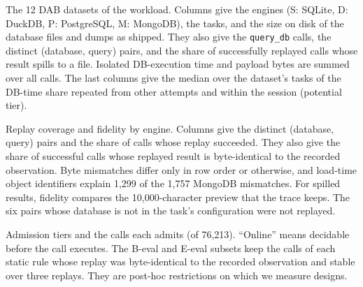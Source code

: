 \begin{table}[tbp]
  \caption{The 12 DAB datasets of the workload. Columns give the engines (S: SQLite, D: DuckDB, P: PostgreSQL, M:
  MongoDB), the tasks, and the size on disk of the database files and dumps as shipped. They also give the
  \texttt{query\_db} calls, the distinct (database, query) pairs, and the share of successfully replayed calls whose
  result spills to a file. Isolated DB-execution time and payload bytes are summed over all calls. The last columns
  give the median over the dataset's tasks of the DB-time share repeated from other attempts and within the session
  (potential tier).}
  \label{tab:datasets}
  \small
  
\end{table}

\begin{table}[htbp]
  \caption{Replay coverage and fidelity by engine. Columns give the distinct (database, query) pairs and the share of calls
  whose replay succeeded. They also give the share of successful calls whose replayed result is byte-identical to
  the recorded observation. Byte mismatches differ only in row order or otherwise, and load-time object identifiers
  explain 1,299 of the 1,757 MongoDB mismatches. For spilled results, fidelity compares the 10,000-character preview that the trace keeps.
  The six pairs whose database is not in the task's configuration were not replayed.}
  \label{tab:workload}
  \small\setlength{\tabcolsep}{2.6pt}
  
\end{table}

\begin{table}[htbp]
  \caption{Admission tiers and the calls each admits (of 76,213). ``Online'' means decidable before the call executes.
  The B-eval and E-eval subsets keep the calls of each static rule whose replay was byte-identical to the recorded
  observation and stable over three replays. They are post-hoc restrictions on which we measure designs.}
  \label{tab:tiers}
  \small\setlength{\tabcolsep}{3pt}
  
\end{table}

